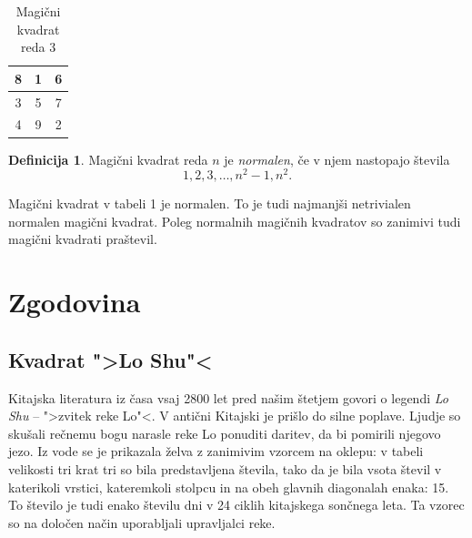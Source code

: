 \documentclass[a4paper,12pt]{article}
\theoremstyle{definition}
\newtheorem{definicija}{Definicija}
\theoremstyle{plain}
\begin{document}
\begin{table}[h]
   \centering
   \caption{Magični kvadrat reda 3}
   \label{table:mag3}
   
   \begin{tabular}{|c|c|c|}
   \hline 
    8 & 1 & 6 \\\hline 
    3 & 5 & 7 \\\hline 
    4 & 9 & 2 \\\hline 
   \end{tabular}
   
\end{table}

  
  \begin{definicija}
    Magični kvadrat reda \(n\) je \emph{normalen}, če v njem nastopajo števila
    \begin{equation}
       1, 2, 3, \ldots, n^2-1, n^2.
       \label{eq:numbers}
    \end{equation}
  \end{definicija}

Magični kvadrat v tabeli 1 je normalen.
To je tudi najmanjši netrivialen normalen magični kvadrat.
Poleg normalnih magičnih kvadratov so zanimivi tudi magični kvadrati praštevil. %


\section{Zgodovina}

\subsection{Kvadrat ">Lo Shu"<}

Kitajska literatura iz časa vsaj 2800 let pred našim štetjem govori o legendi
\emph{Lo Shu} -- ">zvitek reke Lo"<. V antični Kitajski je prišlo do
silne poplave. Ljudje so skušali rečnemu bogu narasle reke Lo ponuditi daritev,
da bi pomirili njegovo jezo. Iz vode se je prikazala želva z zanimivim vzorcem
na oklepu: v tabeli velikosti tri krat tri so bila predstavljena števila, tako
da je bila vsota števil v katerikoli vrstici, kateremkoli stolpcu in na obeh
glavnih diagonalah enaka: 15. To število je tudi enako številu dni v 24 ciklih
kitajskega sončnega leta. Ta vzorec so na določen način uporabljali upravljalci
reke.
\end{document}
